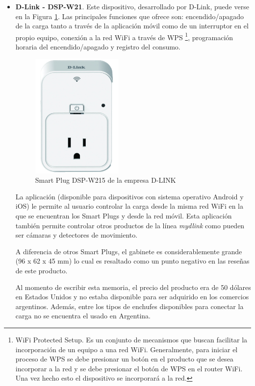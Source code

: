 \begin{itemize}
\item \textbf{D-Link - DSP-W21}. Este dispositivo, desarrollado por D-Link, puede verse en la Figura \ref{fig:smartplug_dlink}. Las principales funciones que ofrece son: encendido/apagado de la carga tanto a través de la aplicación móvil como de un interruptor en el propio equipo, conexión a la red WiFi a través de WPS \footnote{WiFi Protected Setup. Es un conjunto de mecanismos que buscan facilitar la incorporación de un equipo a una red WiFi. Generalmente, para iniciar el proceso de WPS se debe presionar un botón en el producto que se desea incorporar a la red y se debe presionar el botón de WPS en el router WiFi. Una vez hecho esto el dispositivo se incorporará a la red.}, programación horaria del encendido/apagado y registro del consumo.

\begin{figure}[h]
	\centering
	\includegraphics[width=4.5cm]{./Figures/1_2_DSP-W215.png}
	\caption{Smart Plug DSP-W215 de la empresa D-LINK}
	\label{fig:smartplug_dlink}
\end{figure}

La aplicación (disponible para dispositivos con sistema operativo Android y iOS) le permite al usuario controlar la carga desde la misma red WiFi en la que se encuentran los Smart Plugs y desde la red móvil. Esta aplicación también permite controlar otros productos de la línea  \textit{mydlink} como pueden ser cámaras y detectores de movimiento.

A diferencia de otros Smart Plugs, el gabinete es considerablemente grande (96 x 62 x 45 mm) lo cual es resaltado como un punto negativo en las reseñas de este producto.

Al momento de escribir esta memoria, el precio del producto era de 50 dólares en Estados Unidos y no estaba disponible para ser adquirido en los comercios argentinos. Además, entre los tipos de enchufes disponibles para conectar la carga no se encuentra el usado en Argentina.


\end{itemize}

